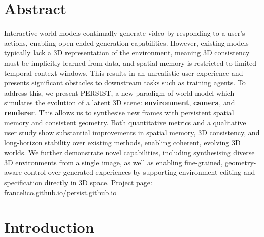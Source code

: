 \section{Abstract}
Interactive world models continually generate video by responding to a user's actions, enabling open-ended generation capabilities.
However, existing models typically lack a 3D representation of the environment, meaning 3D consistency must be implicitly learned from data, and spatial memory is restricted to limited temporal context windows.
This results in an unrealistic user experience and presents significant obstacles to downstream tasks such as training agents.
To address this, we present PERSIST, a new paradigm of world model which simulates the evolution of a latent 3D scene: \textbf{environment}, \textbf{camera}, and \textbf{renderer}.
This allows us to synthesise new frames with persistent spatial memory and consistent geometry. Both quantitative metrics and a qualitative user study show substantial improvements in spatial memory, 3D consistency, and long-horizon stability over existing methods, enabling coherent, evolving 3D worlds. We further demonstrate novel capabilities, including synthesising diverse 3D environments from a single image, as well as enabling fine-grained, geometry-aware control over generated experiences by supporting environment editing and specification directly in 3D space. Project page: \href{https://francelico.github.io/persist.github.io}{francelico.github.io/persist.github.io}







\section{Introduction}


